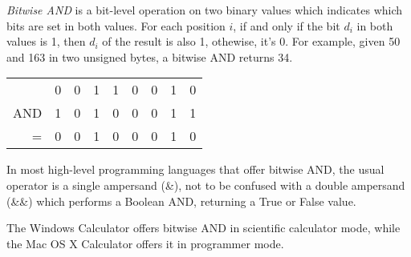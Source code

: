 \documentclass[12pt]{article}
\begin{document}
{\em Bitwise AND} is a bit-level operation on two binary values which indicates which bits are set in both values. For each position $i$, if and only if the bit $d_i$ in both values is 1, then $d_i$ of the result is also 1, othewise, it's 0. For example, given 50 and 163 in two unsigned bytes, a bitwise AND returns 34.

\begin{tabular}{|r|c|c|c|c|c|c|c|c|}
    & 0 & 0 & 1 & 1 & 0 & 0 & 1 & 0 \\
AND & 1 & 0 & 1 & 0 & 0 & 0 & 1 & 1 \\
  = & 0 & 0 & 1 & 0 & 0 & 0 & 1 & 0 \\
\end{tabular}

In most high-level programming languages that offer bitwise AND, the usual operator is a single ampersand (\&), not to be confused with a double ampersand (\&\&) which performs a Boolean AND, returning a True or False value.

The Windows Calculator offers bitwise AND in scientific calculator mode, while the Mac OS X Calculator offers it in programmer mode.

\end{document}
